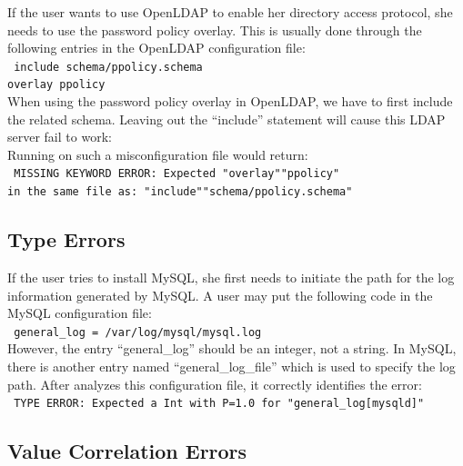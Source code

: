 If the user wants to use OpenLDAP to enable her directory access
protocol, she needs to use the password policy overlay. This is usually
done through the following entries in the OpenLDAP configuration file:\\
\texttt{
 \hspace*{3em}include schema/ppolicy.schema\\
 \hspace*{3em}overlay ppolicy\\}
When using the password policy overlay in OpenLDAP, we have to first include the related schema.
Leaving out the ``include'' statement will cause this LDAP server fail to work:\\
Running \app on such a misconfiguration file would return:\\
\texttt{
MISSING KEYWORD ERROR: Expected "overlay""ppolicy"\\ 
in the same file as: "include""schema/ppolicy.schema"}

\subsection{Type Errors}

If the user tries to install MySQL, she first needs to initiate the path for the log information generated by MySQL. 
A user may put the following code in the MySQL configuration file:\\
\texttt{
 \hspace*{3em}general\_log = /var/log/mysql/mysql.log\\}
However, the entry ``general\_log'' should be an integer, not a string.
 In MySQL, there is another entry named ``general\_log\_file'' which is used to specify the log path.  
After \app analyzes this configuration file, it correctly identifies the error:\\
\texttt{
TYPE ERROR: Expected a Int with P=1.0 for "general\_log[mysqld]"
}

\subsection{Value Correlation Errors}


